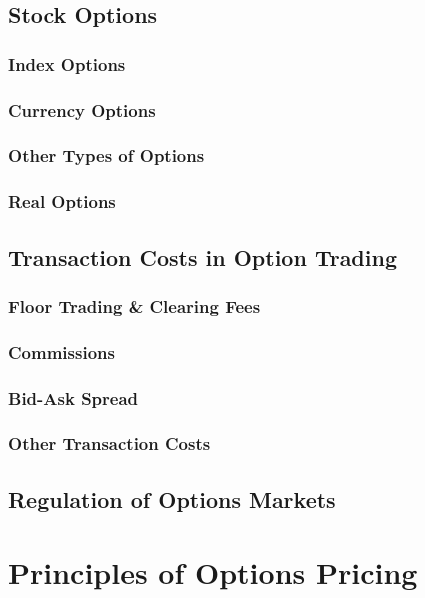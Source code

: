\documentclass{book}
\theoremstyle{definition}
\theoremstyle{remark}
\begin{document}
        \subsection{Stock Options}
        \subsubsection{Index Options}
        \subsubsection{Currency Options}
        \subsubsection{Other Types of Options}
        \subsubsection{Real Options}
    \subsection{Transaction Costs in Option Trading}
        \subsubsection{Floor Trading \& Clearing Fees}
        \subsubsection{Commissions}
        \subsubsection{Bid-Ask Spread}
        \subsubsection{Other Transaction Costs}
    \subsection{Regulation of Options Markets}
    
\newpage
\section{Principles of Options Pricing}
\end{document}
